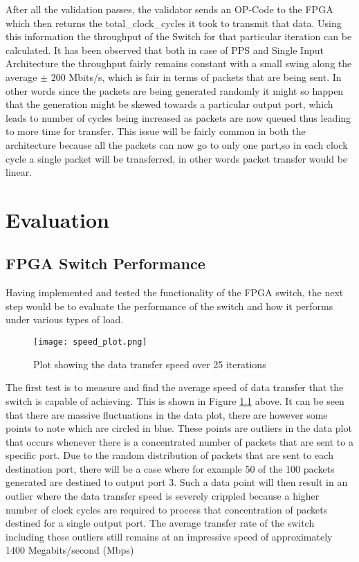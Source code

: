 \documentclass[twoside,12pt,fleqn]{book} %
\begin{document}
After all the validation passes, the validator sends an OP-Code to the FPGA which then returns the total\_clock\_cycles it took to transmit that data. Using this information the throughput of the Switch for that particular iteration can be calculated. It has been observed that both in case of PPS and Single Input Architecture the throughput fairly remains constant with a small swing along the average $\pm$ 200 Mbits/s, which is fair in terms of packets that are being sent. In other words since the packets are being generated randomly it might so happen that the generation might be skewed towards a particular output port, which leads to number of cycles being increased as packets are now queued thus leading to more time for transfer. This issue will be fairly common in both the architecture because all the packets can now go to only one part,so in each clock cycle a single packet will be transferred, in other words packet transfer would be linear.

\chapter{Evaluation}

\section{FPGA Switch Performance}
Having implemented and tested the functionality of the FPGA switch, the next step would be to evaluate the performance of the switch and how it performs under various types of load. 

\begin{figure}[ht]
    \centering
    \texttt{[image: speed\_plot.png]}
    \caption{Plot showing the data transfer speed over 25 iterations}
    \label{fig:speed_plot}
\end{figure}
The first test is to measure and find the average speed of data transfer that the switch is capable of achieving. This is shown in Figure \ref{fig:speed_plot} above. It can be seen that there are massive fluctuations in the data plot, there are however some points to note which are circled in blue. These points are outliers in the data plot that occurs whenever there is a concentrated number of packets that are sent to a specific port. Due to the random distribution of packets that are sent to each destination port, there will be a case where for example 50 of the 100 packets generated are destined to output port 3. Such a data point will then result in an outlier where the data transfer speed is severely crippled because a higher number of clock cycles are required to process that concentration of packets destined for a single output port. The average transfer rate of the switch including these outliers still remains at an impressive speed of approximately 1400 Megabits/second (Mbps)
 
\end{document}
